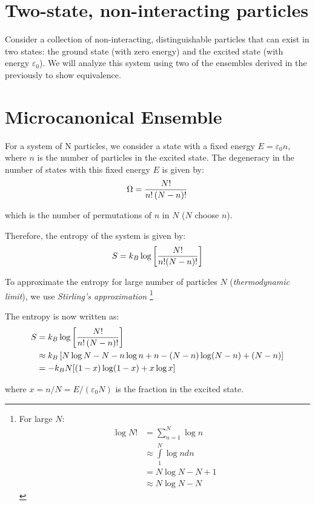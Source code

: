 \documentclass[book.tex]{subfiles}
\begin{document}
\section{Two-state, non-interacting particles}

Consider a collection of non-interacting, distinguishable particles that can exist in two states: the ground state (with zero energy) and the excited state (with energy $\varepsilon_0$). We will analyze this system using two of the ensembles derived in the previously to show equivalence.

\section{Microcanonical Ensemble}
For a system of N particles, we consider a state with a fixed energy $E = \varepsilon_0 n$, where $n$ is the number of particles in the excited state. The degeneracy in the number of states with this fixed energy $E$ is given by:
\begin{align}
\Omega = \frac{N!}{n!\left(N-n\right)!} \notag
\end{align}

\noindent which is the number of permutations of $n$ in $N$ ($N$ choose $n$).

Therefore, the entropy of the system is given by:
\begin{align}
S = k_B \log \left[\frac{N!}{n!(N-n)!}\right] \notag
\end{align}

To approximate the entropy for large number of particles $N$ (\textit{thermodynamic limit}), we use \textit{Stirling's approximation} \footnote{For large $N$: 
\begin{align*}
\log N! &= \sum\limits_{n=1}^N \log n \\
& \approx \int\limits_1^N \log n dn \\ 
&= N \log N - N +1 \\
& \approx N \log N -N
\end{align*}}

The entropy is now written as:
\begin{align}
S &= k_B\log \left[\frac{N!}{n!\left(N-n\right)!}\right] \notag\\
&\approx k_B \left[N\log N -N -n\log n+n-(N-n)\log (N-n) + (N-n)\right] \notag\\
&= -k_B N [(1-x) \log (1-x) + x \log x] \notag
\end{align}

\noindent where $x=n/N = E/\left(\varepsilon_0 N\right)$ is the fraction in the excited state.
\end{document}
